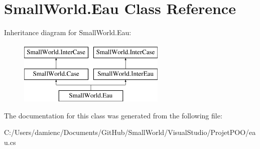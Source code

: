 \hypertarget{class_small_world_1_1_eau}{\section{Small\-World.\-Eau Class Reference}
\label{class_small_world_1_1_eau}
}
Inheritance diagram for Small\-World.\-Eau\-:\begin{figure}[H]
\begin{center}
\leavevmode
\includegraphics[height=3.000000cm]{class_small_world_1_1_eau}
\end{center}
\end{figure}


The documentation for this class was generated from the following file\-:\begin{DoxyCompactItemize}
\item 
C\-:/\-Users/damienc/\-Documents/\-Git\-Hub/\-Small\-World/\-Visual\-Studio/\-Projet\-P\-O\-O/eau.\-cs\end{DoxyCompactItemize}
